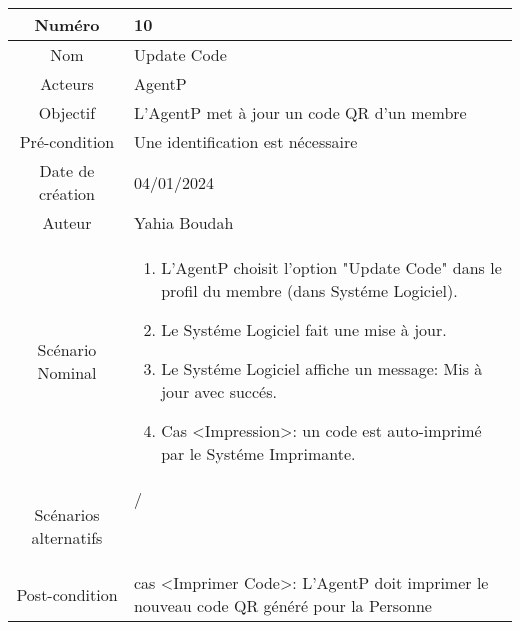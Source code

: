 


\begin{tabular}{ |c|p{12cm}| }
    \hline
    Numéro & 10 \\
    \hline
    Nom & Update Code \\
    \hline
    Acteurs & AgentP \\ 
    \hline
    Objectif & L'AgentP met à jour un code QR d'un membre \\ 
    \hline
    Pré-condition & Une identification est nécessaire \\
    \hline
    Date de création & 04/01/2024 \\
    \hline
    Auteur & Yahia Boudah \\
    \hline
    Scénario Nominal & \begin{enumerate}
        \item L'AgentP choisit l'option "Update Code" dans le profil du membre (dans Systéme Logiciel).
        \item Le Systéme Logiciel fait une mise à jour.
        \item Le Systéme Logiciel affiche un message: Mis à jour avec succés.
        \item Cas <Impression>: un code est auto-imprimé par le Systéme Imprimante.
    \end{enumerate} \\
    \hline
    Scénarios alternatifs & \begin{description}
        \item[/]
    \end{description} \\
    \hline
    Post-condition & cas <Imprimer Code>: L'AgentP doit imprimer le nouveau code QR généré pour la Personne \\
    \hline
\end{tabular}